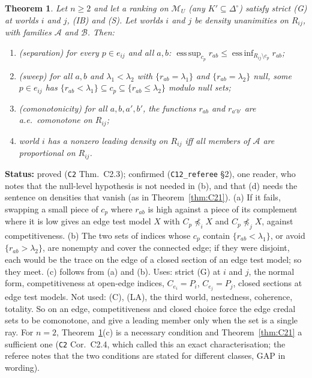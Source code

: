 \documentclass[11pt]{article}
\newtheorem{theorem}{Theorem}[section]
\theoremstyle{definition}
\theoremstyle{remark}
\newcommand{\Di}{\Delta^{\circ}}
\newcommand{\M}{\mathcal M}
\newcommand{\src}[1]{\texttt{#1}}
\newcommand{\status}[1]{\par\smallskip\noindent\textbf{Status:} #1\par\smallskip}
\begin{document}
\begin{theorem}\label{thm:C23}
Let $n\ge2$ and let a ranking on $\M_U$ (any $K'\subseteq\Di$) satisfy strict (G) at worlds $i$ and $j$, (IB) and (S). Let worlds $i$ and $j$ be density unanimities on $R_{ij}$, with families $\mathcal A$ and $\mathcal B$. Then:
\begin{enumerate}[leftmargin=*,label=(\alph*)]
\item (separation) for every $p\in e_{ij}$ and all $a,b$: $\operatorname{ess\,sup}_{c_p}r_{ab}\le\operatorname{ess\,inf}_{R_{ij}\setminus c_p}r_{ab}$;
\item (sweep) for all $a,b$ and $\lambda_1<\lambda_2$ with $\{r_{ab}=\lambda_1\}$ and $\{r_{ab}=\lambda_2\}$ null, some $p\in e_{ij}$ has $\{r_{ab}<\lambda_1\}\subseteq c_p\subseteq\{r_{ab}\le\lambda_2\}$ modulo null sets;
\item (comonotonicity) for all $a,b,a',b'$, the functions $r_{ab}$ and $r_{a'b'}$ are a.e.\ comonotone on $R_{ij}$;
\item world $i$ has a nonzero leading density on $R_{ij}$ iff all members of $\mathcal A$ are proportional on $R_{ij}$.
\end{enumerate}
\end{theorem}
\status{proved (\src{C2} Thm.~C2.3); confirmed (\src{C12\_referee} \S2), one reader, who notes that the null-level hypothesis is not needed in (b), and that (d) needs the sentence on densities that vanish (as in Theorem~\ref{thm:C21}). (a) If it fails, swapping a small piece of $c_p$ where $r_{ab}$ is high against a piece of its complement where it is low gives an edge test model $X$ with $C_p\not\preceq_iX$ and $C_p\not\preceq_jX$, against competitiveness. (b) The two sets of indices whose $c_p$ contain $\{r_{ab}<\lambda_1\}$, or avoid $\{r_{ab}>\lambda_2\}$, are nonempty and cover the connected edge; if they were disjoint, each would be the trace on the edge of a closed section of an edge test model; so they meet. (c) follows from (a) and (b). Uses: strict (G) at $i$ and $j$, the normal form, competitiveness at open-edge indices, $C_{e_i}=P_i$, $C_{e_j}=P_j$, closed sections at edge test models. Not used: (C), (LA), the third world, nestedness, coherence, totality. So on an edge, competitiveness and closed choice force the edge credal sets to be comonotone, and give a leading member only when the set is a single ray. For $n=2$, Theorem~\ref{thm:C23}(c) is a necessary condition and Theorem~\ref{thm:C21} a sufficient one (\src{C2} Cor.~C2.4, which called this an exact characterisation; the referee notes that the two conditions are stated for different classes, GAP in wording).}
\end{document}
